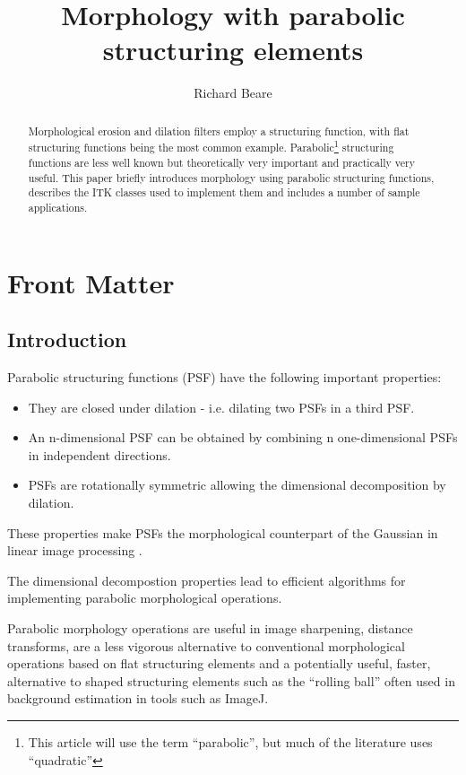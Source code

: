\documentclass{InsightArticle}
\title{Morphology with parabolic structuring elements}
\author{Richard Beare}
\begin{document}
\maketitle

\ifhtml
\chapter*{Front Matter\label{front}}
\fi


\begin{abstract}
\noindent
Morphological erosion and dilation filters employ a structuring
function, with flat structuring functions being the most common
example. Parabolic\footnote{This article will use the term
``parabolic'', but much of the literature uses ``quadratic''}
structuring functions are less well known but theoretically very
important and practically very useful. This paper briefly introduces
morphology using parabolic structuring functions, describes the ITK
classes used to implement them and includes a number of sample
applications.
\end{abstract}

\tableofcontents

\section{Introduction}
Parabolic structuring functions (PSF) have the following important properties:
\begin{itemize}
\item They are closed under dilation - i.e. dilating two PSFs in a third PSF.
\item An n-dimensional PSF can be obtained by combining n
one-dimensional PSFs in independent directions.
\item PSFs are rotationally symmetric allowing the dimensional
decomposition by dilation.
\end{itemize}
These properties make PSFs the morphological counterpart of the
Gaussian in linear image processing \cite{Boomgaard96}.

The dimensional decompostion properties lead to efficient algorithms
for implementing parabolic morphological operations.

Parabolic morphology operations are useful in image sharpening,
distance transforms, are a less vigorous alternative to conventional
morphological operations based on flat structuring elements and a
potentially useful, faster, alternative to shaped structuring elements
such as the ``rolling ball'' often used in background estimation in
tools such as ImageJ.
\end{document}
